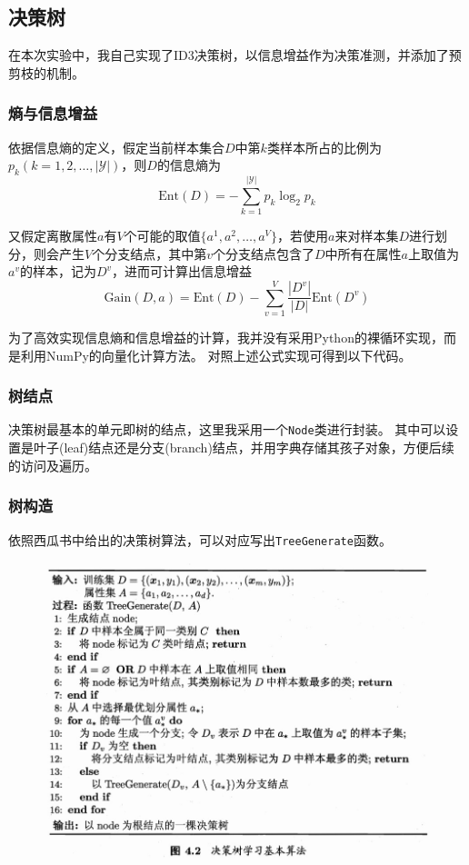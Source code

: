 \documentclass[logo,reportComp]{thesis}
\begin{document}
\subsection{决策树}
在本次实验中，我自己实现了ID3决策树，以信息增益作为决策准测，并添加了预剪枝的机制。

\subsubsection{熵与信息增益}
依据信息熵的定义，假定当前样本集合$D$中第$k$类样本所占的比例为$p_k(k=1,2,\ldots,|\mathcal{Y}|)$，则$D$的信息熵为
\[\mathrm{Ent}(D)=-\sum_{k=1}^{|\mathcal{Y}|}p_k\log_2 p_k\]

又假定离散属性$a$有$V$个可能的取值$\{a^1,a^2,\ldots,a^V\}$，若使用$a$来对样本集$D$进行划分，则会产生$V$个分支结点，其中第$v$个分支结点包含了$D$中所有在属性$a$上取值为$a^v$的样本，记为$D^v$，进而可计算出信息增益
\[\mathrm{Gain}(D,a)=\mathrm{Ent}(D)-\sum_{v=1}^V\frac{|D^v|}{|D|}\mathrm{Ent}(D^v)\]

为了高效实现信息熵和信息增益的计算，我并没有采用Python的裸循环实现，而是利用NumPy的向量化计算方法。
对照上述公式实现可得到以下代码。


\subsubsection{树结点}
决策树最基本的单元即树的结点，这里我采用一个\verb'Node'类进行封装。
其中可以设置是叶子(leaf)结点还是分支(branch)结点，并用字典存储其孩子对象，方便后续的访问及遍历。


\subsubsection{树构造}
依照西瓜书中给出的决策树算法，可以对应写出\verb'TreeGenerate'函数。
\begin{figure}[H]
\centering
\includegraphics[width=0.8\linewidth]{fig/dt_pseudo.jpg}
\end{figure}
\end{document}
